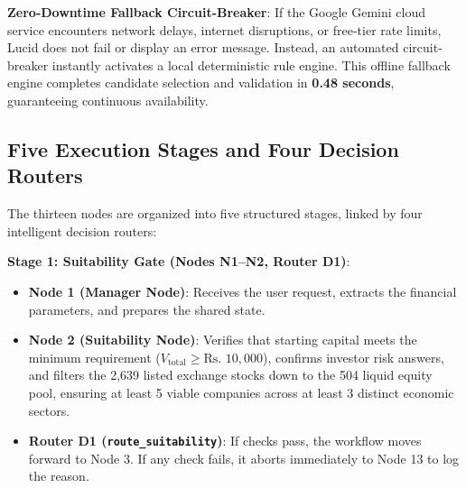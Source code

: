 \noindent \textbf{Zero-Downtime Fallback Circuit-Breaker}:
If the Google Gemini cloud service encounters network delays, internet disruptions, or free-tier rate limits, Lucid does not fail or display an error message. Instead, an automated circuit-breaker instantly activates a local deterministic rule engine. This offline fallback engine completes candidate selection and validation in \textbf{0.48 seconds}, guaranteeing continuous availability.

\subsection{Five Execution Stages and Four Decision Routers}
The thirteen nodes are organized into five structured stages, linked by four intelligent decision routers:

\noindent \textbf{Stage 1: Suitability Gate (Nodes N1--N2, Router D1)}:
\begin{itemize}
    \item \textbf{Node 1 (Manager Node)}: Receives the user request, extracts the financial parameters, and prepares the shared state.
    \item \textbf{Node 2 (Suitability Node)}: Verifies that starting capital meets the minimum requirement ($V_{\text{total}} \ge \text{Rs.~}10,000$), confirms investor risk answers, and filters the 2,639 listed exchange stocks down to the 504 liquid equity pool, ensuring at least 5 viable companies across at least 3 distinct economic sectors.
    \item \textbf{Router D1 (\texttt{route\_suitability})}: If checks pass, the workflow moves forward to Node 3. If any check fails, it aborts immediately to Node 13 to log the reason.
\end{itemize}

